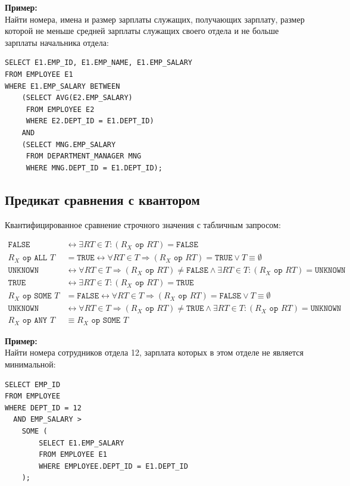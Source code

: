 \documentclass[a4paper,12pt]{article}
\begin{document}
\textbf{Пример:}\\
Найти номера, имена и размер зарплаты служащих, получающих зарплату, размер которой не меньше средней зарплаты служащих своего отдела и не больше зарплаты начальника отдела:
\begin{lstlisting}
SELECT E1.EMP_ID, E1.EMP_NAME, E1.EMP_SALARY 
FROM EMPLOYEE E1 
WHERE E1.EMP_SALARY BETWEEN 
    (SELECT AVG(E2.EMP_SALARY) 
     FROM EMPLOYEE E2 
     WHERE E2.DEPT_ID = E1.DEPT_ID) 
    AND 
    (SELECT MNG.EMP_SALARY 
     FROM DEPARTMENT_MANAGER MNG 
     WHERE MNG.DEPT_ID = E1.DEPT_ID);
\end{lstlisting}

\subsection{Предикат сравнения с квантором}

Квантифицированное сравнение строчного значения с табличным запросом:

\[
\begin{aligned}
\texttt{FALSE} &\leftrightarrow \exists RT \in T: (R_X \texttt{ op } RT) = \texttt{FALSE} \\
R_X \texttt{ op } \texttt{ALL } T &= \texttt{TRUE} \leftrightarrow \forall RT \in T \Rightarrow (R_X \texttt{ op } RT) = \texttt{TRUE} \lor T \equiv \emptyset \\
\texttt{UNKNOWN} &\leftrightarrow \forall RT \in T \Rightarrow (R_X \texttt{ op } RT) \neq \texttt{FALSE} \land \exists RT \in T: (R_X \texttt{ op } RT) = \texttt{UNKNOWN} \\
\texttt{TRUE} &\leftrightarrow \exists RT \in T: (R_X \texttt{ op } RT) = \texttt{TRUE} \\
R_X \texttt{ op } \texttt{SOME } T &= \texttt{FALSE} \leftrightarrow \forall RT \in T \Rightarrow (R_X \texttt{ op } RT) = \texttt{FALSE} \lor T \equiv \emptyset \\
\texttt{UNKNOWN} &\leftrightarrow \forall RT \in T \Rightarrow (R_X \texttt{ op } RT) \neq \texttt{TRUE} \land \exists RT \in T: (R_X \texttt{ op } RT) = \texttt{UNKNOWN} \\
R_X \texttt{ op } \texttt{ANY } T &\equiv R_X \texttt{ op } \texttt{SOME } T
\end{aligned}
\]

\textbf{Пример:}\\
Найти номера сотрудников отдела 12, зарплата которых в этом отделе не является минимальной:
\begin{lstlisting}
SELECT EMP_ID 
FROM EMPLOYEE 
WHERE DEPT_ID = 12 
  AND EMP_SALARY > 
    SOME (
        SELECT E1.EMP_SALARY 
        FROM EMPLOYEE E1 
        WHERE EMPLOYEE.DEPT_ID = E1.DEPT_ID
    );
\end{lstlisting}
\end{document}
